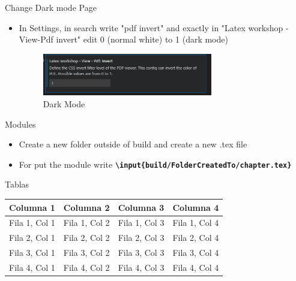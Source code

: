 \documentclass{article}
\theoremstyle{mytheoremstyle}
\theoremstyle{mytheoremstyle}
\theoremstyle{myproblemstyle}
\begin{document}
    \maketitle
    Change Dark mode Page
    \begin{itemize}
        \item In Settings, in search write "pdf invert"  and exactly in "Latex workshop - View-Pdf invert" edit 0 (normal white) to 1 (dark mode)
        \begin{figure}[h]
            \centering
            \includegraphics[width=0.7\textwidth ]{img/darkmode.PNG}
            \caption{Dark Mode}
            \label{fig:Dark Mode}
        \end{figure}
    \end{itemize}

    \maketitle
    Modules
    \begin{itemize}
        \item Create a new folder outside of build and create a new .tex file
        \item For put the module write \textbf{\texttt{\textbackslash input\{build/FolderCreatedTo/chapter.tex\}}}
    \end{itemize}

   
    
    
    \maketitle
    Tablas\\

    \begin{tabular}{|c|c|c|c|}
        \hline
        \textbf{Columna 1} & \textbf{Columna 2} & \textbf{Columna 3} & \textbf{Columna 4} \\
        \hline
        Fila 1, Col 1 & Fila 1, Col 2 & Fila 1, Col 3 & Fila 1, Col 4 \\
        \hline
        Fila 2, Col 1 & Fila 2, Col 2 & Fila 2, Col 3 & Fila 2, Col 4 \\
        \hline
        Fila 3, Col 1 & Fila 3, Col 2 & Fila 3, Col 3 & Fila 3, Col 4 \\
        \hline
        Fila 4, Col 1 & Fila 4, Col 2 & Fila 4, Col 3 & Fila 4, Col 4 \\
        \hline
    \end{tabular}

     \printbibliography
\end{document}
